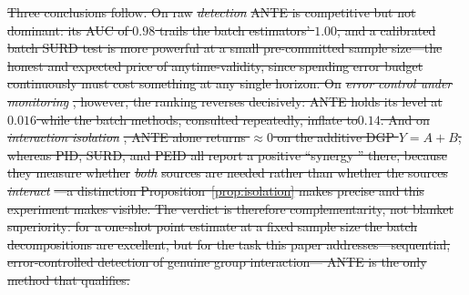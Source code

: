 \documentclass[pdflatex,sn-mathphys-ay]{sn-jnl}%
\theoremstyle{thmstyleone}%
\theoremstyle{thmstyletwo}%
\theoremstyle{thmstylethree}%
\providecommand{\DIFdel}[1]{{\protect\color{red}\sout{#1}}}                      %
\begin{document}
\DIFdel{Three conclusions follow. On raw }\emph{\DIFdel{detection}} %
\DIFdel{ANTE is competitive but not
dominant: its AUC of $0.98$ trails the batch estimators' $1.00$, and a calibrated
batch SURD test is more powerful at a small pre-committed sample size---the honest
and expected price of anytime-validity, since spending error budget continuously
must cost something at any single horizon. On }\emph{\DIFdel{error control under
monitoring}}%
\DIFdel{, however, the ranking reverses decisively: ANTE holds its level at
$0.016$ while the batch methods, consulted repeatedly, inflate to$0.14$. And on
}\emph{\DIFdel{interaction isolation}}%
\DIFdel{, ANTE alone returns $\approx0$ on the additive DGP
$Y=A+B$, whereas PID, SURD, and PEID all report a positive ``synergy '' there, because they measure whether }\emph{\DIFdel{both}} %
\DIFdel{sources are needed rather than whether the sources }\emph{\DIFdel{interact}}%
\DIFdel{---a distinction Proposition~\ref{prop:isolation} makes
precise and this experiment makes visible. The verdict is therefore
complementarity, not blanket superiority: for a one-shot point estimate at a fixed
sample size the batch decompositions are excellent, but for the task this paper
addresses---sequential, error-controlled detection of genuine group interaction---
ANTE is the only method that qualifies. }%
\end{document}
